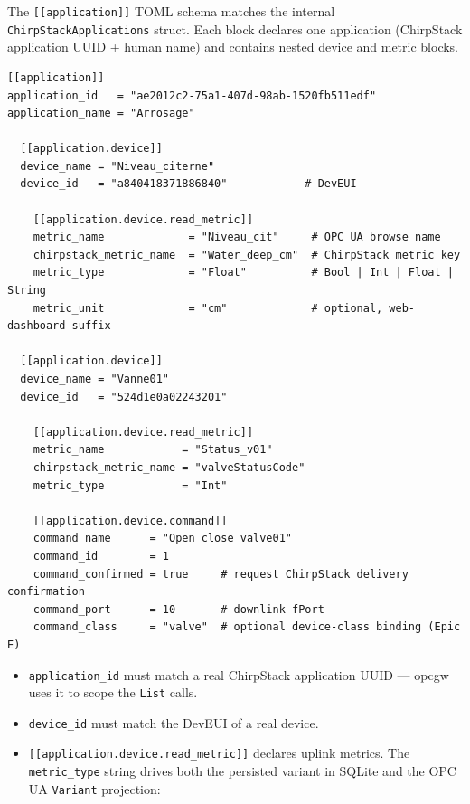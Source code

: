 The \texttt{{[}{[}application{]}{]}} TOML schema matches the internal \texttt{ChirpStackApplications} struct. Each block declares one application (ChirpStack application UUID + human name) and contains nested device and metric blocks.

\begin{lstlisting}
[[application]]
application_id   = "ae2012c2-75a1-407d-98ab-1520fb511edf"
application_name = "Arrosage"

  [[application.device]]
  device_name = "Niveau_citerne"
  device_id   = "a840418371886840"            # DevEUI

    [[application.device.read_metric]]
    metric_name             = "Niveau_cit"     # OPC UA browse name
    chirpstack_metric_name  = "Water_deep_cm"  # ChirpStack metric key
    metric_type             = "Float"          # Bool | Int | Float | String
    metric_unit             = "cm"             # optional, web-dashboard suffix

  [[application.device]]
  device_name = "Vanne01"
  device_id   = "524d1e0a02243201"

    [[application.device.read_metric]]
    metric_name            = "Status_v01"
    chirpstack_metric_name = "valveStatusCode"
    metric_type            = "Int"

    [[application.device.command]]
    command_name      = "Open_close_valve01"
    command_id        = 1
    command_confirmed = true     # request ChirpStack delivery confirmation
    command_port      = 10       # downlink fPort
    command_class     = "valve"  # optional device-class binding (Epic E)
\end{lstlisting}

\begin{itemize}
\item
  \texttt{application\_id} must match a real ChirpStack application UUID --- opcgw uses it to scope the \texttt{List} calls.
\item
  \texttt{device\_id} must match the DevEUI of a real device.
\item
  \texttt{{[}{[}application.device.read\_metric{]}{]}} declares uplink metrics. The \texttt{metric\_type} string drives both the persisted variant in SQLite and the OPC UA \texttt{Variant} projection:
\end{itemize}

